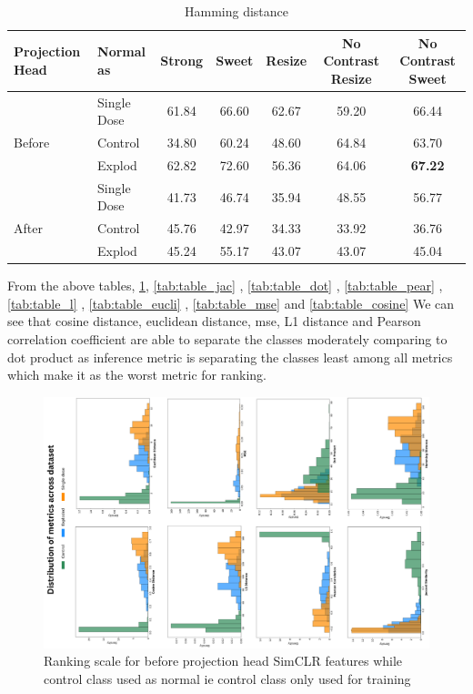 \begin{table}[H]
  \centering
  \begin{tabular}{@{}llccccc@{}}
  \toprule
  Projection Head & Normal as       & Strong & Sweet & Resize & No Contrast Resize & No Contrast Sweet \\ \midrule
                  & Single Dose    & 61.84      & 66.60     & 62.67      & 59.20                  & 66.44                 \\
  Before          & Control        & 34.80      & 60.24     & 48.60      & 64.84                  & 63.70                 \\
                  & Explod         & 62.82      & 72.60     & 56.36      & 64.06                  & \textbf{67.22}                 \\ \midrule
                  & Single Dose    & 41.73      & 46.74     & 35.94      & 48.55                  & 56.77                 \\
  After           & Control        & 45.76      & 42.97     & 34.33      & 33.92                  & 36.76                 \\
                  & Explod         & 45.24      & 55.17     & 43.07      & 43.07                  & 45.04                \\ \bottomrule
  \end{tabular}
  \caption{Hamming  distance}
  \label{tab:table_hammi}
\end{table}
From the above tables, \ref{tab:table_hammi},  \ref{tab:table_jac} ,  \ref{tab:table_dot} ,  \ref{tab:table_pear} ,  \ref{tab:table_l} ,  \ref{tab:table_eucli} ,  \ref{tab:table_mse} and \ref{tab:table_cosine} 
We can see that cosine distance, euclidean distance, mse, L1 distance and  Pearson correlation coefficient are able to separate the classes moderately comparing to dot product as inference metric is separating the classes least among all metrics which make it as the worst metric for ranking.

\begin{figure}[H]
  \centering
  \includegraphics[scale=0.5, angle=270]{figures/predall.pdf} 
  \caption{Ranking scale for before projection head SimCLR  features while control class used as normal ie control class only used for training}
  \label{fig:bargraph}
\end{figure}


